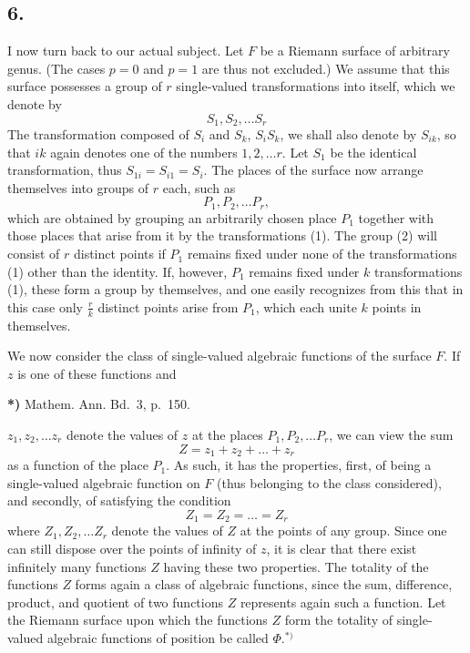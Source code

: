 \documentclass{article}
\begin{document}
\subsection*{6.}

I now turn back to our actual subject. Let $F$ be a Riemann surface of arbitrary genus. (The cases $p = 0$ and $p = 1$ are thus not excluded.) We assume that this surface possesses a group of $r$ single-valued transformations into itself, which we denote by
\[
S_1, S_2, \dots S_r
\tag{1}
\]
The transformation composed of $S_i$ and $S_k$, $S_i S_k$, we shall also denote by $S_{ik}$, so that $ik$ again denotes one of the numbers $1, 2, \dots r$. Let $S_1$ be the identical transformation, thus $S_{1i} = S_{i1} = S_i$. The places of the surface now arrange themselves into groups of $r$ each, such as
\[
P_1, P_2, \dots P_r,
\tag{2}
\]
which are obtained by grouping an arbitrarily chosen place $P_1$ together with those places that arise from it by the transformations (1). The group (2) will consist of $r$ distinct points if $P_1$ remains fixed under none of the transformations (1) other than the identity. If, however, $P_1$ remains fixed under $k$ transformations (1), these form a group by themselves, and one easily recognizes from this that in this case only $\frac{r}{k}$ distinct points arise from $P_1$, which each unite $k$ points in themselves.

We now consider the class of single-valued algebraic functions of the surface $F$. If $z$ is one of these functions and

\textbf{*)} Mathem. Ann. Bd.~3, p.~150.

$z_1, z_2, \dots z_r$ denote the values of $z$ at the places $P_1, P_2, \dots P_r$, we can view the sum
\[
Z = z_1 + z_2 + \dots + z_r
\]
as a function of the place $P_1$. As such, it has the properties, first, of being a single-valued algebraic function on $F$ (thus belonging to the class considered), and secondly, of satisfying the condition
\[
Z_1 = Z_2 = \dots = Z_r
\]
where $Z_1, Z_2, \dots Z_r$ denote the values of $Z$ at the points of any group. Since one can still dispose over the points of infinity of $z$, it is clear that there exist infinitely many functions $Z$ having these two properties. The totality of the functions $Z$ forms again a class of algebraic functions, since the sum, difference, product, and quotient of two functions $Z$ represents again such a function. Let the Riemann surface upon which the functions $Z$ form the totality of single-valued algebraic functions of position be called $\Phi$.${}^{*)}$
\end{document}
